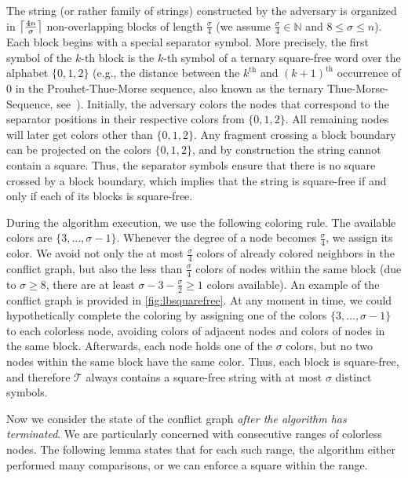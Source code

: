 The string (or rather family of strings) constructed by the adversary is organized in $\left\lceil\frac {4n} \sigma\right\rceil$ non-overlapping blocks of length $\frac \sigma 4$ (we assume $\frac \sigma 4 \in \mathbb N$ and $8 \leq \sigma \leq n$).
Each block begins with a special separator symbol. 
More precisely, the first symbol of the $k$-th block is the $k$-th symbol of a ternary square-free word over the alphabet $\{0,1,2\}$ (e.g., the distance between the $k^{\text{th}}$ and $(k+1)^{\text{th}}$ occurrence of 0 in the Prouhet-Thue-Morse sequence, also known as the ternary Thue-Morse-Sequence, see~\cite[Corollary~1]{Allouche1998}).
Initially, the adversary colors the nodes that correspond to the separator positions in their respective colors from $\{0,1,2\}$.
All remaining nodes will later get colors other than $\{0,1,2\}$. Any fragment crossing a block boundary can be projected on the colors $\{0,1,2\}$, and by construction the string cannot contain a square.
Thus, the separator symbols ensure that there is no square crossed by a block boundary, which implies that the string is square-free if and only if each of its blocks is square-free. 

During the algorithm execution, we use the following coloring rule. The available colors are $\{3, \dots, \sigma - 1\}$. Whenever the degree of a node becomes $\frac \sigma 4$, we assign its color. We avoid not only the at most $\frac \sigma 4$ colors of already colored neighbors in the conflict graph, but also the less than $\frac \sigma 4$ colors of nodes within the same block (due to $\sigma \geq 8$, there are at least $\sigma - 3 - \frac \sigma 2 \geq 1$ colors available). An example of the conflict graph is provided in \cref{fig:lbsquarefree}. At any moment in time, we could hypothetically complete the coloring by assigning one of the colors $\{3, \dots, \sigma - 1\}$ to each colorless node, avoiding colors of adjacent nodes and colors of nodes in the same block. Afterwards, each node holds one of the $\sigma$ colors, but no two nodes within the same block have the same color. Thus, each block is square-free, and therefore $\mathcal T$ always contains a square-free string with at most $\sigma$ distinct symbols. 

Now we consider the state of the conflict graph \emph{after the algorithm has terminated}. 
We are particularly concerned with consecutive ranges of colorless nodes.
The following lemma states that for each such range, the algorithm either performed many comparisons, or we can enforce a square within the range.

